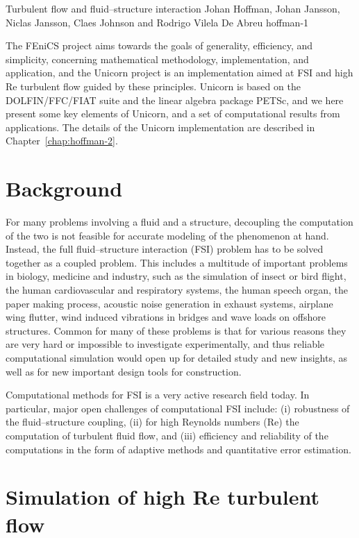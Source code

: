               {Turbulent flow and fluid--structure interaction}
              {Johan Hoffman, Johan Jansson, Niclas Jansson, Claes Johnson and Rodrigo Vilela De Abreu}
              {hoffman-1}

The FEniCS project aims towards the goals of generality, efficiency,
and simplicity, concerning mathematical methodology, implementation,
and application, and the Unicorn project is an implementation aimed at
FSI and high Re turbulent flow guided by these principles. Unicorn is
based on the DOLFIN/FFC/FIAT suite and the linear algebra package
PETSc, and we here present some key elements of Unicorn, and a set of
computational results from applications. The details of the Unicorn
implementation are described in Chapter~\ref{chap:hoffman-2}.

\section{Background}

For many problems involving a fluid and a structure, decoupling the
computation of the two is not feasible for accurate modeling of the
phenomenon at hand. Instead, the full fluid--structure interaction (FSI)
problem has to be solved together as a coupled problem. This includes a
multitude of important problems in biology, medicine and industry, such
as the simulation of insect or bird flight, the human cardiovascular
and respiratory systems, the human speech organ, the paper making
process, acoustic noise generation in exhaust systems, airplane wing
flutter, wind induced vibrations in bridges and wave loads on offshore
structures. Common for many of these problems is that for various reasons
they are very hard or impossible to investigate experimentally, and thus
reliable computational simulation would open up for detailed study and
new insights, as well as for new important design tools for construction.

Computational methods for FSI is a very active research field today. In
particular, major open challenges of computational FSI include: (i)
robustness of the fluid--structure coupling, (ii) for high Reynolds
numbers (Re) the computation of turbulent fluid flow, and (iii) efficiency
and reliability of the computations in the form of adaptive methods and
quantitative error estimation.

\section{Simulation of high Re turbulent flow}

